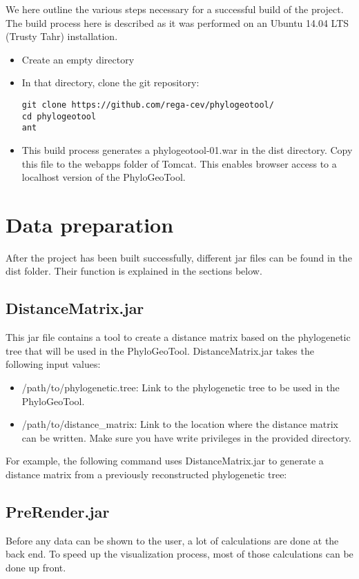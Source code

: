 \documentclass[a4paper, 11pt]{article} %
\begin{document}
We here outline the various steps necessary for a successful build of the project.
The build process here is described as it was performed on an Ubuntu 14.04 LTS (Trusty Tahr) installation.
\begin{itemize}
\item Create an empty directory
\item {In that directory, clone the git repository: 
\begin{verbatim}
git clone https://github.com/rega-cev/phylogeotool/
cd phylogeotool
ant
\end{verbatim}
}
\item This build process generates a phylogeotool-01.war in the dist directory. Copy this file to the webapps folder of Tomcat. This enables browser access to a localhost version of the PhyloGeoTool.
\end{itemize}

\section{Data preparation}
\label{sec:jars}
After the project has been built successfully, different jar files can be found in the dist folder. 
Their function is explained in the sections below.

\subsection{DistanceMatrix.jar}
This jar file contains a tool to create a distance matrix based on the phylogenetic tree that will be used in the PhyloGeoTool.
DistanceMatrix.jar takes the following input values:
\begin{itemize}
\item /path/to/phylogenetic.tree: Link to the phylogenetic tree to be used in the PhyloGeoTool. %
\item /path/to/distance\_matrix: Link to the location where the distance matrix can be written. Make sure you have write privileges in the provided directory.
\end{itemize}
For example, the following command uses DistanceMatrix.jar to generate a distance matrix from a previously reconstructed phylogenetic tree: %


\subsection{PreRender.jar}
Before any data can be shown to the user, a lot of calculations are done at the back end. 
To speed up the visualization process, most of those calculations can be done up front.
\end{document}
